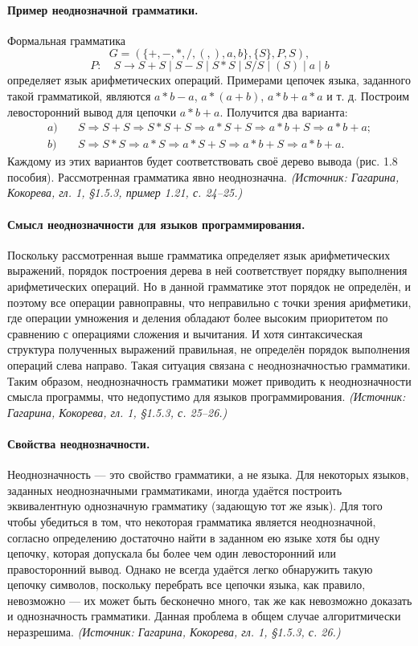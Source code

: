\documentclass[a4paper,12pt]{article}
\begin{document}
\paragraph{Пример неоднозначной грамматики.}
Формальная грамматика
\[
G=(\{+,-,*,/,(,),a,b\},\{S\},P,S),
\]
\[
P:\quad S\to S+S\mid S-S\mid S*S\mid S/S\mid (S)\mid a\mid b
\]
определяет язык арифметических операций. Примерами цепочек языка, заданного такой грамматикой, являются \(a*b-a\), \(a*(a+b)\), \(a*b+a*a\) и т. д. Построим левосторонний вывод для цепочки \(a*b+a\). Получится два варианта:
\[
\begin{aligned}
a)\quad & S\Rightarrow S+S\Rightarrow S*S+S\Rightarrow a*S+S\Rightarrow a*b+S\Rightarrow a*b+a;\\
b)\quad & S\Rightarrow S*S\Rightarrow a*S\Rightarrow a*S+S\Rightarrow a*b+S\Rightarrow a*b+a.
\end{aligned}
\]
Каждому из этих вариантов будет соответствовать своё дерево вывода (рис. 1.8 пособия). Рассмотренная грамматика явно неоднозначна.
\textit{(Источник: Гагарина, Кокорева, гл. 1, §1.5.3, пример 1.21, с. 24--25.)}

\paragraph{Смысл неоднозначности для языков программирования.}
Поскольку рассмотренная выше грамматика определяет язык арифметических выражений, порядок построения дерева в ней соответствует порядку выполнения арифметических операций. Но в данной грамматике этот порядок не определён, и поэтому все операции равноправны, что неправильно с точки зрения арифметики, где операции умножения и деления обладают более высоким приоритетом по сравнению с операциями сложения и вычитания. И хотя синтаксическая структура полученных выражений правильная, не определён порядок выполнения операций слева направо. Такая ситуация связана с неоднозначностью грамматики. Таким образом, неоднозначность грамматики может приводить к неоднозначности смысла программы, что недопустимо для языков программирования.
\textit{(Источник: Гагарина, Кокорева, гл. 1, §1.5.3, с. 25--26.)}

\paragraph{Свойства неоднозначности.}
Неоднозначность — это свойство грамматики, а не языка. Для некоторых языков, заданных неоднозначными грамматиками, иногда удаётся построить эквивалентную однозначную грамматику (задающую тот же язык). Для того чтобы убедиться в том, что некоторая грамматика является неоднозначной, согласно определению достаточно найти в заданном ею языке хотя бы одну цепочку, которая допускала бы более чем один левосторонний или правосторонний вывод. Однако не всегда удаётся легко обнаружить такую цепочку символов, поскольку перебрать все цепочки языка, как правило, невозможно — их может быть бесконечно много, так же как невозможно доказать и однозначность грамматики. Данная проблема в общем случае алгоритмически неразрешима.
\textit{(Источник: Гагарина, Кокорева, гл. 1, §1.5.3, с. 26.)}
\end{document}

